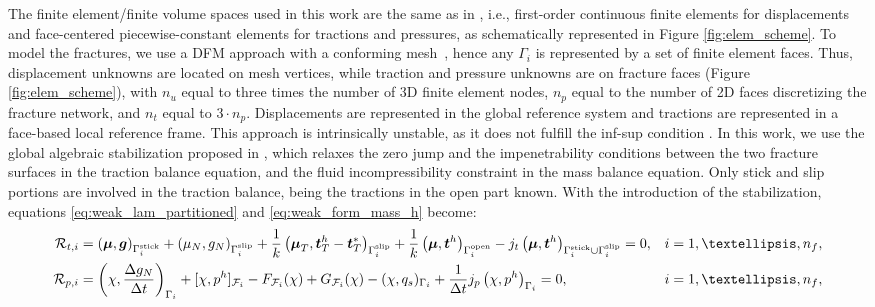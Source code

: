 \documentclass[3p,times]{elsarticle}
\theoremstyle{plain}
\renewcommand{\vec}[1]{\boldsymbol{#1}}
\newcommand{\tensorOne}[1]{\boldsymbol#1}
\newcommand{\tensorTwo}[1]{\boldsymbol#1}
\begin{document}
The finite element/finite volume spaces used in this work are the same as in
\cite{fr2020alg}, i.e., first-order continuous finite elements for displacements and
face-centered piecewise-constant elements for tractions and pressures, as schematically represented in Figure \ref{fig:elem_scheme}. 
To model the fractures, we use a DFM approach
with a conforming mesh~\cite{GarKarTch16}, hence any $\Gamma_i$ is
represented by a set of finite element faces.
Thus,
displacement unknowns are located on mesh vertices, while traction and pressure unknowns are
on fracture faces (Figure \ref{fig:elem_scheme}), with $n_u$ equal to three times the number of 3D finite element nodes, $n_p$ equal to the number of 2D faces discretizing the fracture network, and $n_t$ equal to $3\cdot n_p$. Displacements are represented in the global reference system and
tractions are represented in a face-based local reference frame. %
This approach is intrinsically unstable, as
it does not fulfill the inf-sup condition \cite{wohlmuth2011variationally}. In this work,
we use the global algebraic stabilization proposed in \cite{fr2020alg}, which relaxes the
zero jump and the impenetrability conditions between the two fracture surfaces in the traction balance equation, and the fluid incompressibility constraint in the mass balance equation.
Only stick and slip portions are involved in the traction balance, being the tractions in the open part known.
With the introduction of the stabilization, equations
\eqref{eq:weak_lam_partitioned} and \eqref{eq:weak_form_mass_h} become:
\begin{subequations}
\begin{align}
  \mathcal{R}_{t,i}
  &= \left( \tensorOne{\mu}, \tensorOne{g} \right)_{\Gamma_{i}^{\text{stick}} }
  + \left( \mu_N, g_N\right)_{\Gamma_{i}^{\text{slip}}}
  + \frac{1}{k}\left( \tensorTwo{\mu}_T, \tensorOne{t}_{T}^h - \tensorOne{t}_T^*
    \right)_{\Gamma_{i}^{\text{slip}}}
  + \frac{1}{k}\left( \tensorTwo{\mu}, \tensorTwo{t}^h
    \right)_{\Gamma_{i}^{\text{open}}}
  - j_t \left( \tensorTwo{\mu}, \tensorTwo{t}^h \right)_{\Gamma_i^{\text{stick}}
    \cup\Gamma_i^{\text{slip}}}
  = 0, & &i=1,\ldots,n_f,
  \label{eq:weak_lam_partitioned_stab} \\
  \mathcal{R}_{p,i} &= \left( \chi, \frac{\Delta g_{N} }{\Delta t} \right)_{\Gamma_i}
    + [ \chi, p^h ]_{\mathcal{F}_i} - F_{\mathcal{F}_i}(\chi) + G_{\mathcal{F}_i}(\chi)
    - ( \chi, q_s )_{\Gamma_i} + \frac{1}{\Delta t} j_p \left( \chi, p^h \right)_{\Gamma_i} = 0, & & i=1,\ldots,n_f, \label{eq:weak_mass_partitioned_stab}
  \end{align}
  \label{eq:weak_stab}\null
\end{subequations}
\end{document}
